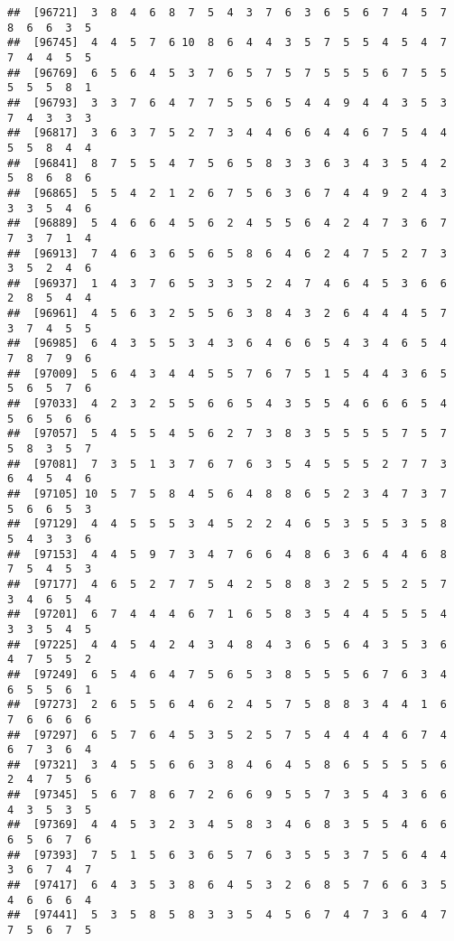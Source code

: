 \documentclass[
]{book}
\begin{document}
\begin{verbatim}
##  [96721]  3  8  4  6  8  7  5  4  3  7  6  3  6  5  6  7  4  5  7  8  6  6  3  5
##  [96745]  4  4  5  7  6 10  8  6  4  4  3  5  7  5  5  4  5  4  7  7  4  4  5  5
##  [96769]  6  5  6  4  5  3  7  6  5  7  5  7  5  5  5  6  7  5  5  5  5  5  8  1
##  [96793]  3  3  7  6  4  7  7  5  5  6  5  4  4  9  4  4  3  5  3  7  4  3  3  3
##  [96817]  3  6  3  7  5  2  7  3  4  4  6  6  4  4  6  7  5  4  4  5  5  8  4  4
##  [96841]  8  7  5  5  4  7  5  6  5  8  3  3  6  3  4  3  5  4  2  5  8  6  8  6
##  [96865]  5  5  4  2  1  2  6  7  5  6  3  6  7  4  4  9  2  4  3  3  3  5  4  6
##  [96889]  5  4  6  6  4  5  6  2  4  5  5  6  4  2  4  7  3  6  7  7  3  7  1  4
##  [96913]  7  4  6  3  6  5  6  5  8  6  4  6  2  4  7  5  2  7  3  3  5  2  4  6
##  [96937]  1  4  3  7  6  5  3  3  5  2  4  7  4  6  4  5  3  6  6  2  8  5  4  4
##  [96961]  4  5  6  3  2  5  5  6  3  8  4  3  2  6  4  4  4  5  7  3  7  4  5  5
##  [96985]  6  4  3  5  5  3  4  3  6  4  6  6  5  4  3  4  6  5  4  7  8  7  9  6
##  [97009]  5  6  4  3  4  4  5  5  7  6  7  5  1  5  4  4  3  6  5  5  6  5  7  6
##  [97033]  4  2  3  2  5  5  6  6  5  4  3  5  5  4  6  6  6  5  4  5  6  5  6  6
##  [97057]  5  4  5  5  4  5  6  2  7  3  8  3  5  5  5  5  7  5  7  5  8  3  5  7
##  [97081]  7  3  5  1  3  7  6  7  6  3  5  4  5  5  5  2  7  7  3  6  4  5  4  6
##  [97105] 10  5  7  5  8  4  5  6  4  8  8  6  5  2  3  4  7  3  7  5  6  6  5  3
##  [97129]  4  4  5  5  5  3  4  5  2  2  4  6  5  3  5  5  3  5  8  5  4  3  3  6
##  [97153]  4  4  5  9  7  3  4  7  6  6  4  8  6  3  6  4  4  6  8  7  5  4  5  3
##  [97177]  4  6  5  2  7  7  5  4  2  5  8  8  3  2  5  5  2  5  7  3  4  6  5  4
##  [97201]  6  7  4  4  4  6  7  1  6  5  8  3  5  4  4  5  5  5  4  3  3  5  4  5
##  [97225]  4  4  5  4  2  4  3  4  8  4  3  6  5  6  4  3  5  3  6  4  7  5  5  2
##  [97249]  6  5  4  6  4  7  5  6  5  3  8  5  5  5  6  7  6  3  4  6  5  5  6  1
##  [97273]  2  6  5  5  6  4  6  2  4  5  7  5  8  8  3  4  4  1  6  7  6  6  6  6
##  [97297]  6  5  7  6  4  5  3  5  2  5  7  5  4  4  4  4  6  7  4  6  7  3  6  4
##  [97321]  3  4  5  5  6  6  3  8  4  6  4  5  8  6  5  5  5  5  6  2  4  7  5  6
##  [97345]  5  6  7  8  6  7  2  6  6  9  5  5  7  3  5  4  3  6  6  4  3  5  3  5
##  [97369]  4  4  5  3  2  3  4  5  8  3  4  6  8  3  5  5  4  6  6  6  5  6  7  6
##  [97393]  7  5  1  5  6  3  6  5  7  6  3  5  5  3  7  5  6  4  4  3  6  7  4  7
##  [97417]  6  4  3  5  3  8  6  4  5  3  2  6  8  5  7  6  6  3  5  4  6  6  6  4
##  [97441]  5  3  5  8  5  8  3  3  5  4  5  6  7  4  7  3  6  4  7  7  5  6  7  5

\end{verbatim}
\end{document}
